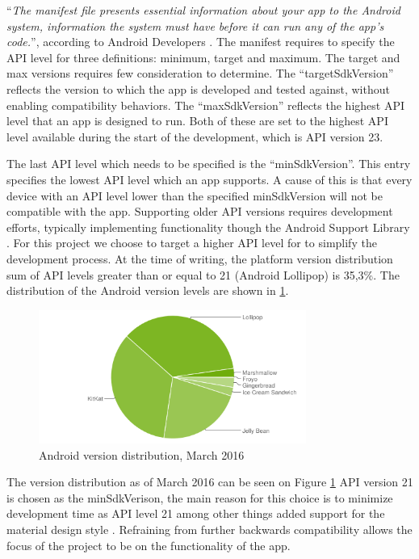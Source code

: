 ``\textit{The manifest file presents essential information about your app to the Android system, information the system must have before it can run any of the app's code.}'', according to Android Developers \cite{androidManifest}.
The manifest requires to specify the API level for three definitions: minimum, target and maximum. 
The target and max versions requires few consideration to determine.
The ``targetSdkVersion'' reflects the version to which the app is developed and tested against, without enabling compatibility behaviors.
The ``maxSdkVersion'' reflects the highest API level that an app is designed to run.
Both of these are set to the highest API level available during the start of the development, which is API version 23.

The last API level which needs to be specified is the ``minSdkVersion''.
This entry specifies the lowest API level which an app supports.
A cause of this is that every device with an API level lower than the specified minSdkVersion will not be compatible with the app.
Supporting older API versions requires development efforts, typically implementing functionality though the Android Support Library \cite{androidSL}.
For this project we choose to target a higher API level for to simplify the development process.
At the time of writing, the platform version distribution sum of API levels greater than or equal to 21 (Android Lollipop) is 35,3\%.
The distribution of the Android version levels are shown in \ref{fig:dashboard}.

\begin{figure}[h]
	\begin{center}
	\includegraphics[width=0.78\textwidth]{figures/android-chart-march.png}
	\end{center}
	\caption{Android version distribution, March 2016 \cite{androidDashboard}}
	\label{fig:dashboard}
\end{figure}
The version distribution as of March 2016 can be seen on Figure \ref{fig:dashboard}
API version 21 is chosen as the minSdkVerison, the main reason for this choice is to minimize development time as API level 21 among other things added support for the material design style \cite{android5API}. Refraining from further backwards compatibility allows the focus of the project to be on the functionality of the app. 

